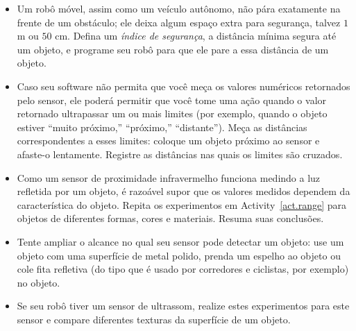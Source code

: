\begin{framed}

\begin{itemize}
\item Um robô móvel, assim como um veículo autônomo, não pára exatamente na frente de um obstáculo; ele deixa algum espaço extra para segurança, talvez $1$ m ou $50$ cm. Defina um \emph{índice de segurança}, a distância mínima segura até um objeto, e programe seu robô para que ele pare a essa distância de um objeto.
\item Caso seu software não permita que você meça os valores numéricos retornados pelo sensor, ele poderá permitir que você tome uma ação quando o valor retornado ultrapassar um ou mais limites (por exemplo, quando o objeto estiver ``muito próximo,'' ``próximo,'' ``distante''). Meça as distâncias correspondentes a esses limites: coloque um objeto próximo ao sensor e afaste-o lentamente. Registre as distâncias nas quais os limites são cruzados.
\end{itemize}
\end{framed}

\begin{framed}

\begin{itemize}
\item Como um sensor de proximidade infravermelho funciona medindo a luz refletida por um objeto, é razoável supor que os valores medidos dependem da característica do objeto. Repita os experimentos em Activity~\ref{act.range} para objetos de diferentes formas, cores e materiais. Resuma suas conclusões.
\item Tente ampliar o alcance no qual seu sensor pode detectar um objeto: use um objeto com uma superfície de metal polido, prenda um espelho ao objeto ou cole fita refletiva (do tipo que é usado por corredores e ciclistas, por exemplo) no objeto.
\item Se seu robô tiver um sensor de ultrassom, realize estes experimentos para este sensor e compare diferentes texturas da superfície de um objeto.
\end{itemize}
\end{framed}

